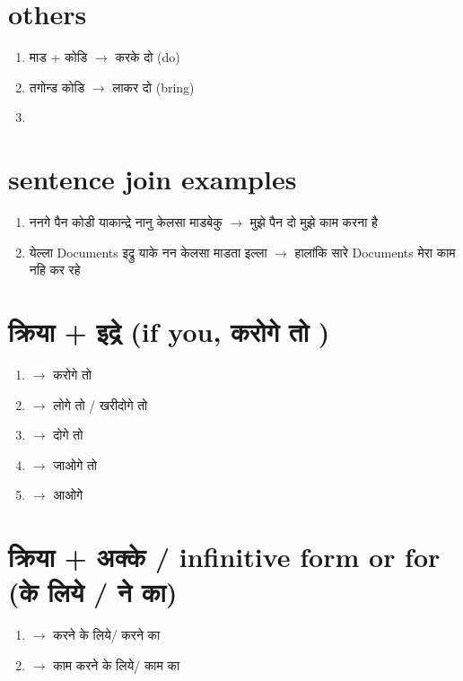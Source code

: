 \documentclass{article}
\begin{document}
\section{others}
\begin{enumerate}
    \item {\s  माड + कोडि $\longrightarrow$ करके दो (do) }
    \item {\s  तगोन्ड कोडि $\longrightarrow$ लाकर दो (bring) }
    \item 

\end{enumerate}


\section{\s  sentence join examples }

\begin{enumerate}
    \item  {\s ननगे पैन​ कोडी याकान्द्रे नानु केलसा माडबेकु $\longrightarrow$ मुझे पैन​ दो  मुझे काम करना है } 
    \item {\s येल्ला Documents इद्रु  याके नन केलसा माडता इल्ला $\longrightarrow$ हालांकि सारे Documents   मेरा काम नहि कर रहे}
\end{enumerate}


\section{\s क्रिया + इद्रे (if you, करोगे तो  )}
\begin{enumerate}
    \item {\s {} $\longrightarrow$ \s करोगे तो  } 
    \item {\s {} $\longrightarrow$ \s लोगे तो / खरीदोगे तो  } 
    \item {\s {}  $\longrightarrow$ \s दोगे तो } 
    \item {\s {}  $\longrightarrow$ \s जाओगे तो } 
    \item {\s {}  $\longrightarrow$ \s  आओगे } 
    
\end{enumerate}

\section{\s क्रिया + अक्के / infinitive form or for (के लिये / ने का)}
\begin{enumerate}
    \item {\s {} $\longrightarrow$ \s करने के लिये/ करने का  } 
    \item {\s {} $\longrightarrow$ \s काम करने के लिये/ काम का  } 

\end{enumerate}
\end{document}
